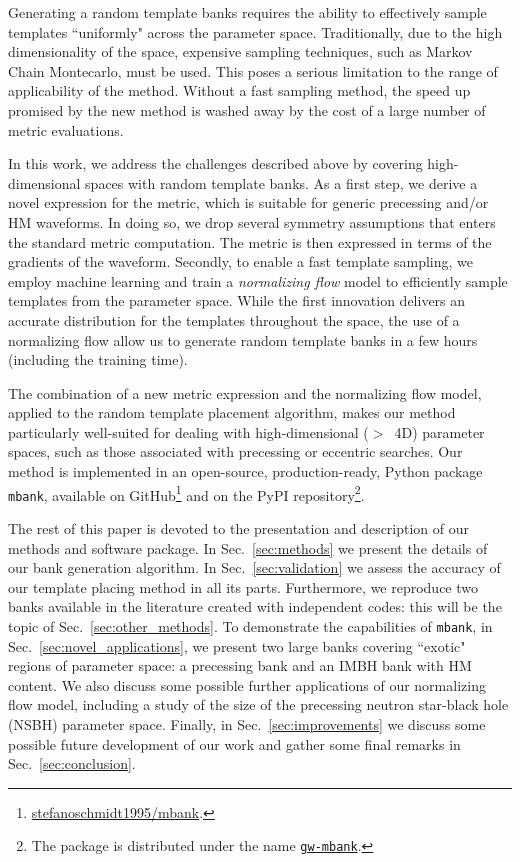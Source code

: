 \documentclass[twocolumn,showpacs,preprintnumbers,nofootinbib,prd,
superscriptaddress,10pt]{revtex4-2}
\begin{document}
Generating a random template banks requires the ability to effectively sample templates ``uniformly" across the parameter space. Traditionally, due to the high dimensionality of the space, expensive sampling techniques, such as Markov Chain Montecarlo, must be used. This poses a serious limitation to the range of applicability of the method. Without a fast sampling method, the speed up promised by the new method is washed away by the cost of a large number of metric evaluations.

In this work, we address the challenges described above by covering high-dimensional spaces with random template banks.
As a first step, we derive a novel expression for the metric, which is suitable for generic precessing and/or HM waveforms. In doing so, we drop several symmetry assumptions that enters the standard metric computation. The metric is then expressed in terms of the gradients of the waveform.
Secondly, to enable a fast template sampling, we employ machine learning and train a {\it normalizing flow} model to efficiently sample templates from the parameter space.
While the first innovation delivers an accurate distribution for the templates throughout the space, the use of a normalizing flow allow us to generate random template banks in a few hours (including the training time).

The combination of a new metric expression and the normalizing flow model, applied to the random template placement algorithm, makes our method particularly well-suited for dealing with high-dimensional ($>$~4D) parameter spaces, such as those associated with precessing or eccentric searches.
Our method is implemented in an open-source, production-ready, Python package \texttt{mbank}\cite{mbank}, available on GitHub\footnote{
\href{https://github.com/stefanoschmidt1995/mbank}{stefanoschmidt1995/mbank}.}
and on the PyPI repository\footnote{
The package is distributed under the name \texttt{\href{https://pypi.org/project/gw-mbank/}{gw-mbank}}.
}.

The rest of this paper is devoted to the presentation and description of our methods and software package.
In Sec.~\ref{sec:methods} we present the details of our bank generation algorithm.
In Sec.~\ref{sec:validation} we assess the accuracy of our template placing method in all its parts.
Furthermore, we reproduce two banks available in the literature \cite{Harry:2017weg, Sakon:2022ibh} created with independent codes: this will be the topic of Sec.~\ref{sec:other_methods}.
To demonstrate the capabilities of \texttt{mbank}, in Sec.~\ref{sec:novel_applications}, we present two large banks covering ``exotic" regions of parameter space: a precessing bank and an IMBH bank with HM content. We also discuss some possible further applications of our normalizing flow model, including a study of the size of the precessing neutron star-black hole (NSBH) parameter space.
Finally, in Sec.~\ref{sec:improvements} we discuss some possible future development of our work and gather some final remarks in Sec.~\ref{sec:conclusion}.
\end{document}
